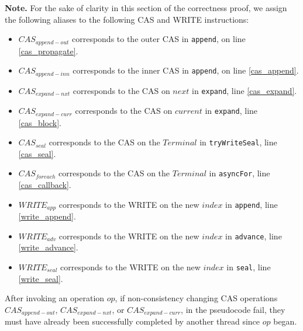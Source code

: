 
\noindent \textbf{Note.} For the sake of clarity in this section of the
correctness proof, we assign the following aliases to the following CAS and
WRITE instructions:

\begin{itemize}
\setlength{\itemindent}{-1em}
\item $CAS_{append-out}$ corresponds to the outer CAS in \verb=append=, on line \ref{cas_propagate}.
\item $CAS_{append-inn}$ corresponds to the inner CAS in \verb=append=, on line \ref{cas_append}.
\item $CAS_{expand-nxt}$ corresponds to the CAS on $next$ in \verb=expand=, line \ref{cas_expand}.
\item $CAS_{expand-curr}$ corresponds to the CAS on $current$ in \verb=expand=, line \ref{cas_block}.
\item $CAS_{seal}$ corresponds to the CAS on the $Terminal$ in \verb=tryWriteSeal=, line \ref{cas_seal}.
\item $CAS_{foreach}$ corresponds to the CAS on the $Terminal$ in \verb=asyncFor=, line \ref{cas_callback}.
\item $WRITE_{app}$ corresponds to the WRITE on the new $index$ in \verb=append=, line \ref{write_append}.
\item $WRITE_{adv}$ corresponds to the WRITE on the new $index$ in \verb=advance=, line \ref{write_advance}.
\item $WRITE_{seal}$ corresponds to the WRITE on the new $index$ in \verb=seal=, line \ref{write_seal}.
\end{itemize}


\begin{lemmatwo}\label{lemma-non-consistency-cas} After invoking an operation
$op$, if non-consistency changing CAS operations $CAS_{append-out}$,
$CAS_{expand-nxt}$, or $CAS_{expand-curr}$, in the pseudocode fail, they must have
already been successfully completed by another thread since $op$ began.
\end{lemmatwo}

